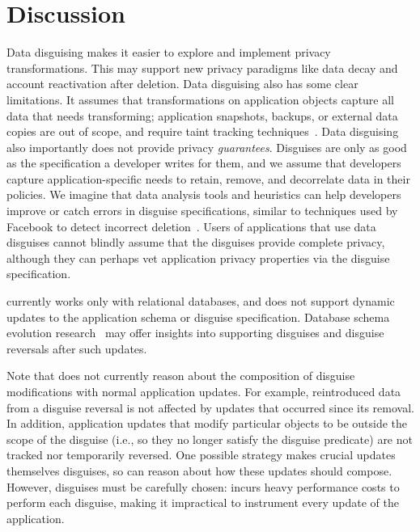\section{Discussion}
%
Data disguising makes it easier to explore and implement privacy transformations.
%
This may support new privacy paradigms like data decay and account reactivation after
deletion.
%
%
%
Data disguising also has some clear limitations.
%
It assumes that transformations on application objects capture all data that needs transforming;
application snapshots, backups, or external data copies are out of scope, and require
\eg taint tracking techniques~\cite{schengendb}.
Data disguising also importantly does not provide privacy \emph{guarantees}.
%
Disguises are only as good as the specification a developer writes for them, and we assume
that developers capture application-specific needs to retain, remove, and decorrelate data in
their policies.
We imagine that data analysis tools and heuristics can help developers improve or catch
errors in disguise specifications, similar to techniques used by Facebook to detect incorrect
deletion~\cite{delf}.
%
Users of applications that use data disguises cannot blindly assume that the disguises provide
complete privacy, although they can perhaps vet application privacy properties via the disguise
specification.
%

\sys currently works only with relational databases, and does not support dynamic
updates to the application schema or disguise specification.
%
Database schema evolution research~\cite{schema:evo} may offer insights
into supporting disguises and disguise reversals after such updates.

Note that \sys does not currently reason about the composition of disguise modifications with normal
application updates. For example, reintroduced data from a disguise reversal is not affected by
updates that occurred since its removal. In addition, application updates that modify particular
objects to be outside the scope of the disguise (i.e., so they no longer satisfy the disguise
predicate) are not tracked nor temporarily reversed. One possible strategy makes crucial updates
themselves disguises, so \sys can reason about how these updates should compose. However, disguises
must be carefully chosen: \sys incurs heavy performance costs to perform each disguise, making it
impractical to instrument every update of the application.


